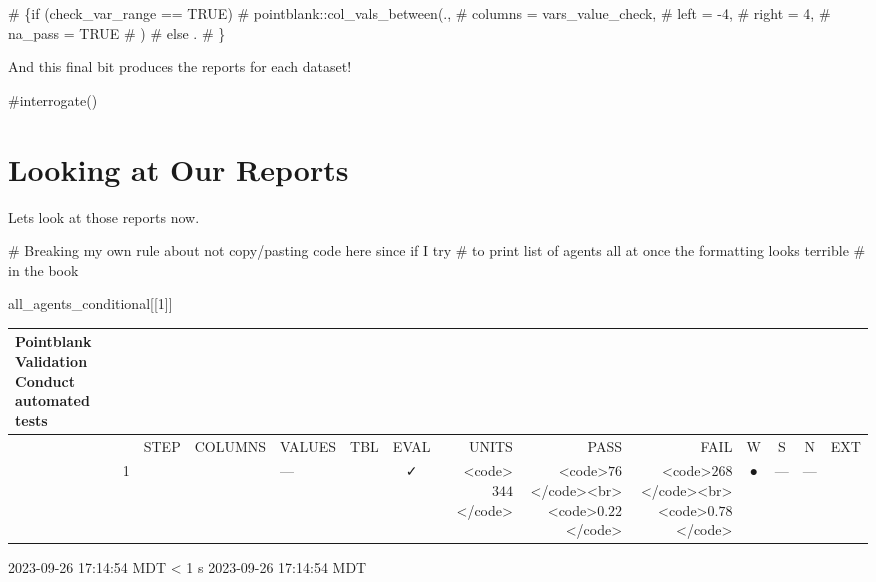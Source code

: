 \documentclass[
  letterpaper,
  DIV=11,
  numbers=noendperiod]{scrreprt}
\newenvironment{Shaded}{\begin{snugshade}}{\end{snugshade}}
\newcommand{\CommentTok}[1]{\textcolor[rgb]{0.37,0.37,0.37}{#1}}
\newcommand{\DecValTok}[1]{\textcolor[rgb]{0.68,0.00,0.00}{#1}}
\newcommand{\NormalTok}[1]{\textcolor[rgb]{0.00,0.23,0.31}{#1}}
\begin{document}
\begin{Shaded}
\begin{Highlighting}[]
\CommentTok{\# \{if (check\_var\_range == TRUE)}
\CommentTok{\#         pointblank::col\_vals\_between(.,}
\CommentTok{\#           columns = vars\_value\_check,}
\CommentTok{\#           left = {-}4,}
\CommentTok{\#           right = 4,}
\CommentTok{\#           na\_pass = TRUE}
\CommentTok{\#         )}
\CommentTok{\#         else .}
\CommentTok{\#         \}}
\end{Highlighting}
\end{Shaded}

And this final bit produces the reports for each dataset!

\begin{Shaded}
\begin{Highlighting}[]
\CommentTok{\#interrogate()}
\end{Highlighting}
\end{Shaded}

\hypertarget{looking-at-our-reports}{%
\section{Looking at Our Reports}\label{looking-at-our-reports}}

Lets look at those reports now.

\begin{Shaded}
\begin{Highlighting}[]
\CommentTok{\# Breaking my own rule about not copy/pasting code here since if I try }
\CommentTok{\# to print list of agents all at once the formatting looks terrible }
\CommentTok{\# in the book}

\NormalTok{all\_agents\_conditional[[}\DecValTok{1}\NormalTok{]]}
\end{Highlighting}
\end{Shaded}

\setlength{\LTpost}{0mm}
\begin{longtable}{lrlllccrrrcccc}
\caption*{
{\large Pointblank Validation} \\ 
{\small Conduct automated tests}
} \\ 
\toprule
 &  & STEP & COLUMNS & VALUES & TBL & EVAL & UNITS & PASS & FAIL & W & S & N & EXT \\ 
\midrule
 & 1 &  &  & — &                                                              & ✓ & <code>$344$</code> & <code>$76$</code><br><code>$0.22$</code> & <code>$268$</code><br><code>$0.78$</code> & ● & --- & --- &  \\ 
\bottomrule
\end{longtable}
\begin{minipage}{\linewidth}
2023-09-26 17:14:54 MDT
\textless{} 1 s
2023-09-26 17:14:54 MDT\\
\end{minipage}
\end{document}
